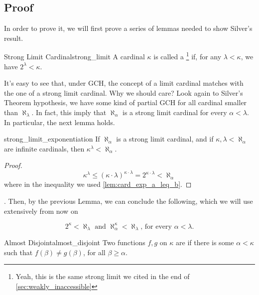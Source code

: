 \subsection{Proof}
In order to prove it, we will first prove a series of lemmas needed to show Silver's result.

\begin{definition}{Strong Limit Cardinal}{strong_limit}
    A cardinal $\kappa$ is called a \footnote{Yeah, this is the same strong limit we cited in the end of \cref{sec:weakly_inaccessible}} if, for any $\lambda<\kappa$, we have $2^\lambda<\kappa$.
\end{definition}

It's easy to see that, under GCH, the concept of a limit cardinal matches with the one of a strong limit cardinal. Why we should care? Look again to Silver's Theorem hypothesis, we have some kind of partial GCH for all cardinal smaller than $\aleph_\lambda$. In fact, this imply that $\aleph_\alpha$ is a strong limit cardinal for every $\alpha<\lambda$. In particular, the next lemma holds.

\begin{lemma}{}{strong_limit_exponentiation}
    If $\aleph_\alpha$ is a strong limit cardinal, and if $\kappa,\lambda<\aleph_\alpha$ are infinite cardinals, then $\kappa^\lambda<\aleph_\alpha$.
\end{lemma}

\begin{proof}
    $$\kappa^\lambda\leq(\kappa\cdot\lambda)^{\kappa\cdot\lambda}=2^{\kappa\cdot\lambda}<\aleph_\alpha$$
    where in the inequality we used \cref{lem:card_exp_a_leq_b}.
\end{proof}

. Then, by the previous Lemma, we can conclude the following, which we will use extensively from now on

\begin{equation}\label{eq:silver_aux_eq}
    2^\kappa<\aleph_\lambda\text{ and }\aleph_\alpha^\kappa<\aleph_\lambda\text{, for every }\alpha<\lambda.
\end{equation}

\begin{definition}{Almost Disjoint}{almost_disjoint}
    Two functions $f,g$ on $\kappa$ are  if there is some $\alpha<\kappa$ such that $f(\beta)\neq g(\beta)$, for all $\beta\geq\alpha$.
\end{definition}

